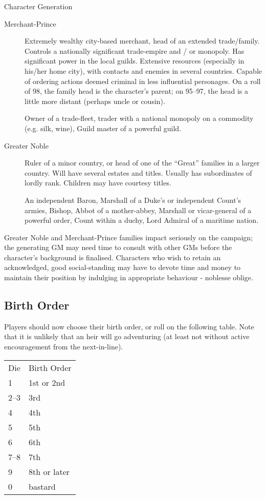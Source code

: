 \begin{Chapter}{Character Generation}
\begin{description}
\item[Merchant-Prince] Extremely wealthy city-based merchant, head of
  an extended trade/family.  Controls a nationally significant
  trade-empire and / or monopoly.  Has significant power in the local
  guilds.  Extensive resources (especially in his/her home city), with
  contacts and enemies in several countries.  Capable of ordering
  actions deemed criminal in less influential personages. On a roll of
  98, the family head is the character’s parent; on 95--97, the head
  is a little more distant (perhaps uncle or cousin).

  \begin{example}
    Owner of a trade-fleet, trader with a national monopoly on a
    commodity (e.g.  silk, wine), Guild master of a powerful guild.
  \end{example}

\item[Greater Noble] Ruler of a minor country, or head of one of the
  “Great” families in a larger country.  Will have several estates and
  titles.  Usually has subordinates of lordly rank.  Children may have
  courtesy titles.

  \begin{example}
    An independent Baron, Marshall of a Duke’s or independent Count’s
    armies, Bishop, Abbot of a mother-abbey, Marshall or vicar-general
    of a powerful order, Count within a duchy, Lord Admiral of a
    maritime nation.
  \end{example}

\end{description}

Greater Noble and Merchant-Prince families impact seriously on the
campaign; the generating GM may need time to consult with other GMs
before the character’s background is finalised. Characters who wish to
retain an acknowledged, good social-standing may have to devote time
and money to maintain their position by indulging in appropriate
behaviour - noblesse oblige.

\subsection{Birth Order}

Players should now choose their birth order, or roll on the following
table. Note that it is unlikely that an heir will go adventuring (at
least not without active encouragement from the next-in-line).

\begin{tabularx}{\columnwidth}{ll}
Die	& Birth Order \\
1	& 1st or 2nd \\  
2–3	& 3rd \\
4	& 4th \\
5	& 5th \\
6	& 6th \\  
7–8	& 7th \\
9	& 8th or later \\
0	& bastard \\
\end{tabularx}


\end{Chapter}
